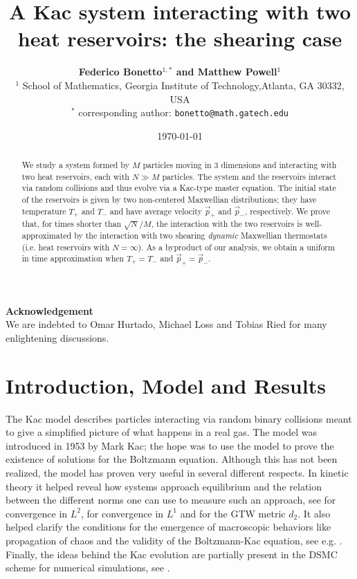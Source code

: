 \documentclass{article}
\title{A Kac system interacting with two heat reservoirs: the shearing case}
\author{{\bf Federico Bonetto$^{1,*}$ and Matthew Powell$^1$}\\
\small $^1$ School of Mathematics, Georgia Institute of Technology,Atlanta, GA 30332, USA\\
\small $^*$ corresponding author: \tt bonetto@math.gatech.edu}
\date{\today}
\begin{document}
\maketitle

\begin{abstract}
We study a system formed by $M$ particles moving in 3 dimensions and interacting with two heat reservoirs, each with
$N\gg M$ particles. The system and the reservoirs interact via random collisions and thus evolve via a Kac-type master
equation. The initial state of the reservoirs is given by two non-centered Maxwellian distributions; they have
temperature $T_+$ and $T_-$ and have average velocity $\vec p_+$ and $\vec p_-$, respectively. We prove
that, for times shorter than $\sqrt{N}/M$, the interaction with the two reservoirs is well-approximated by the
interaction with two shearing {\it dynamic} Maxwellian thermostats (i.e. heat reservoirs with $N=\infty$). As a
byproduct of our analysis, we obtain a uniform in time approximation when $T_+=T_-$ and $\vec p_+=\vec p_-$.
\end{abstract}

\begin{center} {\bf Acknowledgement}\\
\small We are indebted to Omar Hurtado, Michael Loss and Tobias Ried for many enlightening discussions.
\end{center}


\section{Introduction, Model and Results}

The Kac model describes particles interacting via random binary collisions meant to give a simplified picture of what
happens in a real gas. The model was introduced in 1953 by Mark Kac\cite{Kac}; the hope was to use the model to prove
the existence of solutions for the Boltzmann equation. Although this has not been realized, the model has proven very
useful in several different respects. In kinetic theory it helped reveal how systems approach equilibrium and the 
relation between the different norms one can use to measure such an approach, see \cite{CCL1,CCL2} for convergence in 
$L^2$, \cite{PS18} for convergence in $L^1$ and \cite{Hagop} for the GTW metric $d_2$. It also helped clarify the 
conditions for the emergence of macroscopic behaviors like propagation of chaos and the validity of the Boltzmann-Kac 
equation, see e.g. \cite{MischlerMouhot1,MischlerMouhot2,Sznitman84}. Finally, the ideas behind the Kac 
evolution are partially present in the DSMC scheme for numerical simulations, see \cite{B94}. 
\end{document}
